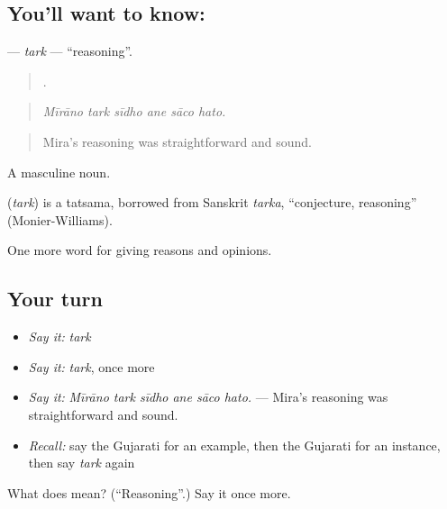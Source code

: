 \subsection*{You'll want to know: }
\textbf{} — \emph{tark} — \textquotedblleft{}reasoning\textquotedblright{}.

\begin{quote}
     .
\end{quote}

\begin{quote}
\emph{Mīrāno tark sīdho ane sāco hato.}
\end{quote}

\begin{quote}
Mira's reasoning was straightforward and sound.
\end{quote}

A masculine noun.

\begin{cousinweb}
\textbf{} (\emph{tark}) is a tatsama, borrowed from Sanskrit \emph{tarka}, \textquotedblleft{}conjecture, reasoning\textquotedblright{} (Monier-Williams).
\end{cousinweb}

\begin{grammarlens}[title={What you've built}]
One more word for giving reasons and opinions.
\end{grammarlens}

\subsection*{Your turn}
\begin{itemize}
\raggedright
  \item \emph{Say it:} \emph{tark}
  \item \emph{Say it:} \emph{tark}, once more
  \item \emph{Say it:} \emph{Mīrāno tark sīdho ane sāco hato.} — Mira's reasoning was straightforward and sound.
  \item \emph{Recall:} say the Gujarati for an example, then the Gujarati for an instance, then say \emph{tark} again
\end{itemize}

\begin{tcolorbox}[breakable,colback=teal!4,colframe=teal!35!black,title={Before you move on}]
What does  mean? (\textquotedblleft{}Reasoning\textquotedblright{}.) Say it once more.
\end{tcolorbox}
